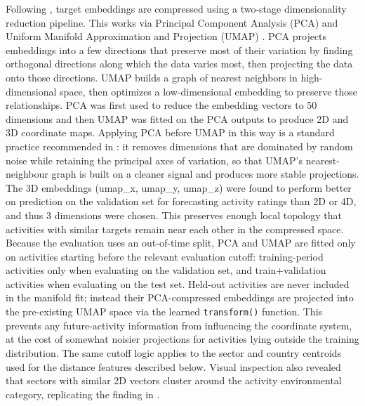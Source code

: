 Following \citep{goldembergMindingGapAid2025}, target embeddings are compressed using a two-stage dimensionality reduction pipeline. This works via Principal Component Analysis (PCA) and Uniform Manifold Approximation and Projection (UMAP) \citep{healyUniformManifoldApproximation2024}. PCA projects embeddings into a few directions that preserve most of their variation by finding orthogonal directions along which the data varies most, then projecting the data onto those directions. UMAP builds a graph of nearest neighbors in high-dimensional space, then optimizes a low-dimensional embedding to preserve those relationships. PCA was first used to reduce the embedding vectors to 50 dimensions and then UMAP was fitted on the PCA outputs to produce 2D and 3D coordinate maps. Applying PCA before UMAP in this way is a standard practice recommended in \citep{healyUniformManifoldApproximation2024}: it removes dimensions that are dominated by random noise while retaining the principal axes of variation, so that UMAP's nearest-neighbour graph is built on a cleaner signal and produces more stable projections. The 3D embeddings (umap\_x, umap\_y, umap\_z) were found to perform better on prediction on the validation set for forecasting activity ratings than 2D or 4D, and thus 3 dimensions were chosen. This preserves enough local topology that activities with similar targets remain near each other in the compressed space. Because the evaluation uses an out-of-time split, PCA and UMAP are fitted only on activities starting before the relevant evaluation cutoff: training-period activities only when evaluating on the validation set, and train+validation activities when evaluating on the test set. Held-out activities are never included in the manifold fit; instead their PCA-compressed embeddings are projected into the pre-existing UMAP space via the learned \texttt{transform()} function. This prevents any future-activity information from influencing the coordinate system, at the cost of somewhat noisier projections for activities lying outside the training distribution. The same cutoff logic applies to the sector and country centroids used for the distance features described below. Visual inspection also revealed that sectors with similar 2D vectors cluster around the activity environmental category, replicating the finding in \citep{goldembergMindingGapAid2025}.

